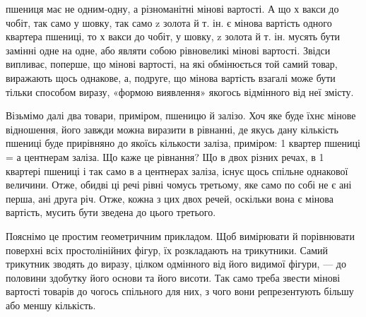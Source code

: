 \parcont{}  %
пшениця має не одним-одну, а різноманітні мінові вартості.
А що х вакси до чобіт, так само у шовку, так само z золота й т. ін.
є мінова вартість одного квартера пшениці, то х вакси до чобіт,
у шовку, z золота й т. ін. мусять бути замінні одне на одне, або
являти собою рівновеликі мінові вартості. Звідси випливає, поперше,
що мінові вартості, на які обмінюється той самий товар,
виражають щось однакове, а, подруге, що мінова вартість взагалі
може бути тільки способом виразу, «формою виявлення» якогось
відмінного від неї змісту.

Візьмімо далі два товари, приміром, пшеницю й залізо. Хоч
яке буде їхнє мінове відношення, його завжди можна виразити
в рівнанні, де якусь дану кількість пшениці буде прирівняно до
якоїсь кількости заліза, приміром: 1 квартер пшениці = а центнерам
заліза. Що каже це рівнання? Що в двох різних речах,
в 1 квартері пшениці і так само в а центнерах заліза, існує щось
спільне однакової величини. Отже, обидві ці речі рівні чомусь
третьому, яке само по собі не є ані перша, ані друга річ. Отже,
кожна з цих двох речей, оскільки вона є мінова вартість, мусить
бути зведена до цього третього.

Пояснімо це простим геометричним прикладом. Щоб вимірювати
й порівнювати поверхні всіх простолінійних фігур, їх розкладають
на трикутники. Самий трикутник зводять до виразу,
цілком одмінного від його видимої фігури, — до половини здобутку
його основи та його висоти. Так само треба звести мінові
вартості товарів до чогось спільного для них, з чого вони репрезентують
більшу або меншу кількість.

